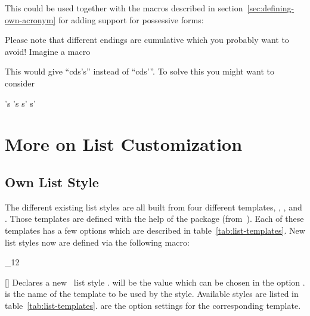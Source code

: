 \documentclass[load-preamble+]{cnltx-doc}
\makeatletter
\renewenvironment{commands}
  {%
    \cnltx@set@catcode_{12}%
    \let\command\cnltx@command
    \cnltxlist
  }
  {\endcnltxlist}
\makeatother
\begin{document}
This could be used together with the macros described in
section~\vref{sec:defining-own-acronym} for adding support for possessive
forms:

Please note that different endings are cumulative which you probably want to
avoid! Imagine a macro
This would give \enquote{\ac{cd}s's} instead of \enquote{\ac{cd}s'}.  To solve
this you might want to consider
\begin{sourcecode}
     {'s} {'s}
       {s'} {s'}
\end{sourcecode}

\section{More on List Customization}\label{sec:more-list-cust}
\subsection{Own List Style}

The different existing list styles are all built from four different
templates, , ,  and .
Those templates are defined with the help of the 
package (from~\cite{bnd:l3packages}).  Each of these templates has a few
options which are described in table~\vref{tab:list-templates}.  New list
styles now are defined via the following macro:

\begin{commands}
  \command{DeclareAcroListStyle}[]
    Declares a new \acro\ list style .   will be the
    value which can be chosen in the option .
     is the name of the template to be used by the style.
    Available styles are listed in table~\ref{tab:list-templates}.
     are the option settings for the corresponding template.
\end{commands}
\end{document}

